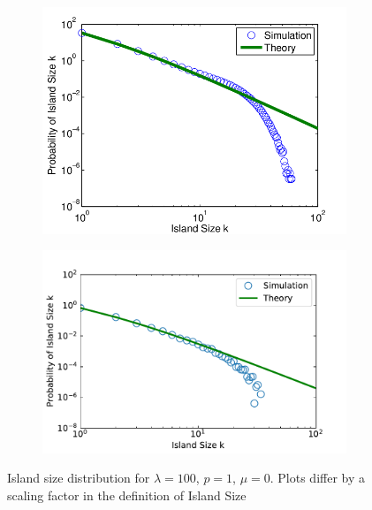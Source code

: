 \documentclass[11pt]{article}
\begin{document}
\begin{figure}[!h]
	\centering
	\begin{subfigure}{\linewidth}
		\centering
		\includegraphics[width=14cm]{plots/5.png}
	\end{subfigure}
	\begin{subfigure}{\linewidth}
		\centering
		\includegraphics[width=15cm]{plots/5.pdf}
	\end{subfigure}
	\caption{Island size distribution for $\lambda=100$, $p=1$, $\mu=0$. Plots differ by a scaling factor in the definition of Island Size}
\end{figure}
\end{document}
